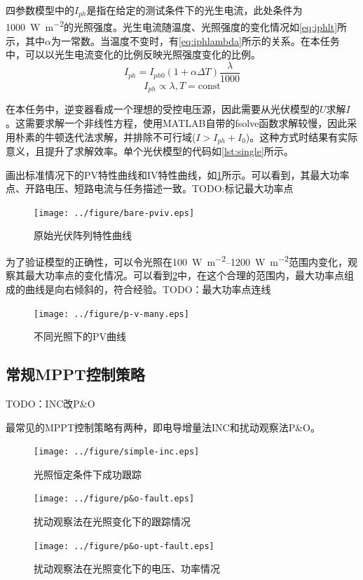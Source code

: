 \documentclass[a4paper,12pt]{article}
\begin{document}
    四参数模型中的$I_{ph}$是指在给定的测试条件下的光生电流，此处条件为\SI{1000}{\W\per\meter\squared}的光照强度。光生电流随温度、光照强度的变化情况如\cref{eq:iphlt}所示，其中$\alpha$为一常数。当温度不变时，有\cref{eq:iphlambda}所示的关系。在本任务中，可以以光生电流变化的比例反映光照强度变化的比例。
    \begin{equation}
        I_{ph}=I_{ph0}(1+\alpha \Delta T)\frac{\lambda}{1000}
        \label{eq:iphlt}
    \end{equation}
    \begin{equation}        
        I_{ph} \propto \lambda, T=\text{const}
        \label{eq:iphlambda}
    \end{equation}
    
    在本任务中，逆变器看成一个理想的受控电压源，因此需要从光伏模型的$U$求解$I$。这需要求解一个非线性方程，使用MATLAB自带的fsolve函数求解较慢，因此采用朴素的牛顿迭代法求解，并排除不可行域($I>I_{ph}+I_0$)。这种方式时结果有实际意义，且提升了求解效率。单个光伏模型的代码如\cref{lst:single}所示。
    
    
    画出标准情况下的PV特性曲线和IV特性曲线，如\cref{fig:bare-pviv}所示。可以看到，其最大功率点、开路电压、短路电流与任务描述一致。TODO:标记最大功率点
    \begin{figure}[htbp]
        \centering
        \texttt{[image: ../figure/bare-pviv.eps]}
        \caption{原始光伏阵列特性曲线}
        \label{fig:bare-pviv}
    \end{figure}

    为了验证模型的正确性，可以令光照在\SIrange{100}{1200}{\W\per\meter\squared}范围内变化，观察其最大功率点的变化情况。可以看到\cref{fig:p-v-many}中，在这个合理的范围内，最大功率点组成的曲线是向右倾斜的，符合经验。TODO：最大功率点连线
    \begin{figure}[htbp]
        \centering
        \texttt{[image: ../figure/p-v-many.eps]}
        \caption{不同光照下的PV曲线}
        \label{fig:p-v-many}
    \end{figure}
    \subsection{常规MPPT控制策略} %
    \label{sub:常规mppt控制策略}
    TODO：INC改P\&O

    最常见的MPPT控制策略有两种，即电导增量法INC和扰动观察法P\&O。
    \begin{figure}[htbp]
        \centering
        \texttt{[image: ../figure/simple-inc.eps]}
        \caption{光照恒定条件下成功跟踪}
        \label{fig:simple-inc}
    \end{figure}
    \begin{figure}[htbp]
        \centering
        \texttt{[image: ../figure/p\&o-fault.eps]}
        \caption{扰动观察法在光照变化下的跟踪情况}
        \label{fig:po-fault}
    \end{figure}
    \begin{figure}[htbp]
        \centering
        \texttt{[image: ../figure/p\&o-upt-fault.eps]}
        \caption{扰动观察法在光照变化下的电压、功率情况}
        \label{fig:po-fault-upt}
    \end{figure}
\end{document}
